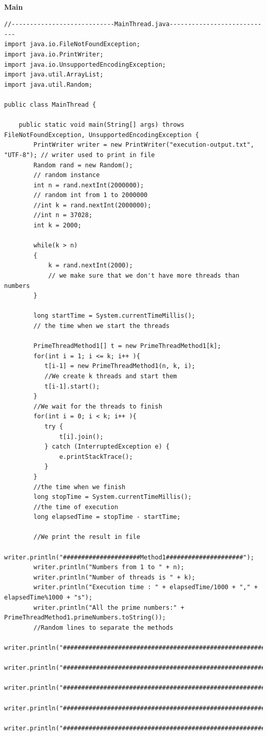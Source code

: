\documentclass[14pt]{article}
\begin{document}
\vspace{5 mm}\\
\textbf{Main}\\
\begin{lstlisting}
//----------------------------MainThread.java----------------------------
import java.io.FileNotFoundException;
import java.io.PrintWriter;
import java.io.UnsupportedEncodingException;
import java.util.ArrayList;
import java.util.Random; 

public class MainThread {

	public static void main(String[] args) throws FileNotFoundException, UnsupportedEncodingException {
		PrintWriter writer = new PrintWriter("execution-output.txt", "UTF-8"); // writer used to print in file
		Random rand = new Random(); 
		// random instance
		int n = rand.nextInt(2000000);
		// random int from 1 to 2000000
	    //int k = rand.nextInt(2000000);
	    //int n = 37028;
	    int k = 2000;

	    while(k > n)
	    {
	    	k = rand.nextInt(2000); 
	    	// we make sure that we don't have more threads than numbers
	    }    

	    long startTime = System.currentTimeMillis(); 
	    // the time when we start the threads
	    
	    PrimeThreadMethod1[] t = new PrimeThreadMethod1[k];
	    for(int i = 1; i <= k; i++ ){
	       t[i-1] = new PrimeThreadMethod1(n, k, i);
	       //We create k threads and start them
	       t[i-1].start();
	    }
	    //We wait for the threads to finish
	    for(int i = 0; i < k; i++ ){
	       try {
	           t[i].join();
	       } catch (InterruptedException e) {
	           e.printStackTrace();
	       }
	    }
	    //the time when we finish
	    long stopTime = System.currentTimeMillis();
	    //the time of execution
	    long elapsedTime = stopTime - startTime;
	    
	    //We print the result in file
	    writer.println("#####################Method1#####################");
	    writer.println("Numbers from 1 to " + n);
	    writer.println("Number of threads is " + k);
	    writer.println("Execution time : " + elapsedTime/1000 + "," + elapsedTime%1000 + "s");
	    writer.println("All the prime numbers:" + PrimeThreadMethod1.primeNumbers.toString());
	    //Random lines to separate the methods
	    writer.println("###########################################################################");
	    writer.println("###########################################################################");
	    writer.println("###########################################################################");
	    writer.println("###########################################################################");
	    writer.println("###########################################################################");
	    

\end{lstlisting}
\end{document}
